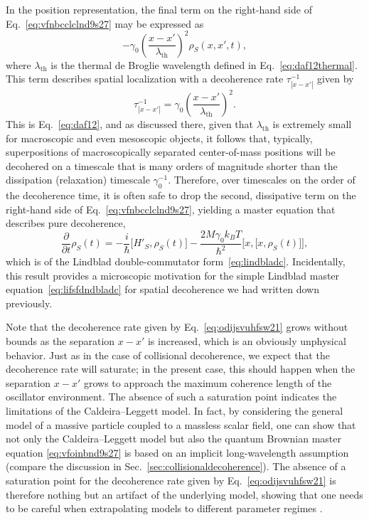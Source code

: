 \documentclass[3p,sort&compress,12pt]{elsarticle}
\providecommand{\abs}[1]{\left\lvert#1\right\rvert}
\newcommand{\I}{\ensuremath{i}}
\newcommand{\op}[1]{#1}
\begin{document}
In the position representation, the final term on the right-hand side of Eq.~\eqref{eq:vfnbcclclnd9s27} may be expressed as
%
\begin{equation}
  \label{eq:fsdojgdj1}
  -  \gamma_0 \left( \frac{x-x'}{\lambda_\text{th}} \right)^2 \rho_S(x,x',t),
\end{equation}
%
where $\lambda_\text{th}$ is the thermal de Broglie wavelength  defined in Eq.~\eqref{eq:daf12thermal}. This term describes spatial localization with a decoherence rate $\tau_{\abs{x-x'}}^{-1}$ given by \cite{Zurek:1986:uz}
%
\begin{equation}
\label{eq:odijsvuhfsw21}
  \tau_{\abs{x-x'}}^{-1} = \gamma_0 \left(
    \frac{x-x'}{\lambda_\text{th}} \right)^2.
\end{equation}
%
This is Eq.~\eqref{eq:daf12}, and as discussed there, given that $\lambda_\text{th}$ is extremely small for macroscopic and even mesoscopic objects, it follows that, typically, superpositions of macroscopically separated center-of-mass positions will be decohered on a timescale that is many orders of magnitude shorter than the dissipation (relaxation) timescale $\gamma^{-1}_0$. Therefore, over timescales on the order of the decoherence time, it is often safe to drop the second, dissipative term on the right-hand side of Eq.~\eqref{eq:vfnbcclclnd9s27}, yielding a master equation that describes pure decoherence,
%
\begin{equation}
\label{eq:vfnbcclasclnd9s27}
  \frac{\partial}{\partial t} \op{\rho}_S(t)  = -\frac{\I}{\hbar} \bigl[
  \op{H}'_S, \op{\rho}_S(t) \bigr] 
 - \frac{2 M\gamma_0 k_B T}{\hbar^2} \bigl[ x, \bigl[ x, \op{\rho}_S(t) \bigr]
\bigr],
\end{equation}
%
which is of the Lindblad double-commutator form~\eqref{eq:lindbladc}. Incidentally, this result provides a microscopic motivation for the simple Lindblad master equation~\eqref{eq:lifsfdndbladc} for spatial decoherence we had written down previously. 

Note that the decoherence rate given by Eq.~\eqref{eq:odijsvuhfsw21} grows without bounds as the separation $x-x'$ is increased, which is an obviously unphysical behavior. Just as in the case of collisional decoherence, we expect that the decoherence rate will saturate; in the present case, this should happen when the separation $x-x'$ grows to approach the maximum coherence length of the oscillator environment. The absence of such a saturation point indicates the limitations of the Caldeira--Leggett model. In fact, by considering the general model of a massive particle coupled to a massless scalar field, one can show \cite{Unruh:1989:rc,Anglin:1997:za,Paz:2001:aa} that not only the Caldeira--Leggett model but also the quantum Brownian master equation \eqref{eq:vfoinbnd9s27} is based on an implicit long-wavelength assumption (compare the discussion in Sec.~\ref{sec:collisionaldecoherence}). The absence of a saturation point for the decoherence rate given by Eq.~\eqref{eq:odijsvuhfsw21} is therefore nothing but an artifact of the underlying model, showing that one needs to be careful when extrapolating models to different parameter regimes \cite{Gallis:1990:un,Gallis:1992:im,Anglin:1997:za}. 
\end{document}
